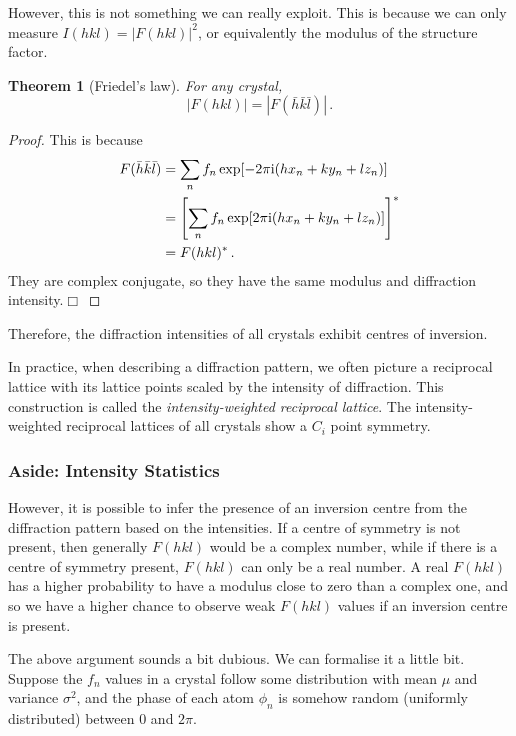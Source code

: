 \documentclass{article}
\theoremstyle{plain}\theoremheaderfont{\normalfont\itshape}\theorembodyfont{\rmfamily}\theoremseparator{.}\newtheorem*{rem}{Remark}\newtheorem*{ex}{Example}\newtheorem*{proof}{Proof}\newtheorem*{altp}{Alternative proof}
\theoremstyle{plain}\theoremheaderfont{\normalfont\bfseries}\theorembodyfont{\rmfamily}\theoremseparator{.}\newtheorem{thm}{Theorem}[section]\newtheorem{lem}[thm]{Lemma}\newtheorem{prop}[thm]{Proposition}\newtheorem*{cor}{Corollary}\newtheorem{defn}[thm]{Definition}\newtheorem{clm}[thm]{Claim}\newtheorem{clminproof}{Claim}\newtheorem*{law}{Law}\newtheorem{pos}[thm]{Postulate}
\theoremstyle{break}\theoremheaderfont{\normalfont\itshape}\theorembodyfont{\rmfamily}\theoremseparator{.\medskip}\newtheorem*{proofskip}{Proof}\newtheorem*{exs}{Examples}\newtheorem*{rems}{Remarks}
\theoremstyle{break}\theoremheaderfont{\normalfont\bfseries}\theorembodyfont{\rmfamily}\theoremseparator{.\medskip}\newtheorem{lemskip}[thm]{Lemma}\newtheorem{defnskip}[thm]{Definition}\newtheorem{propskip}[thm]{Proposition}\newtheorem{thmskip}[thm]{Theorem}
\numberwithin{equation}{section}
\newcommand{\qed}{\hfill\ensuremath{\Box}}
\newcommand{\ii}{\mathrm{i}}
\newcommand{\abs}[1]{\left| #1 \right|}
\begin{document}
    However, this is not something we can really exploit. This is because we can only measure \(I(hkl)=\abs{F(hkl)}^2\), or equivalently the modulus of the structure factor.
    \begin{thm}[Friedel's law]
        For any crystal,
        \begin{equation}
            \abs{F(hkl)}=\abs{F(\bar{h}\bar{k}\bar{l})}\,.
        \end{equation}
    \end{thm}
    \begin{proof}
        This is because
        \begin{align}
            F(\bar{h}\bar{k}\bar{l})&=\sum_n f_n \exp[-2\pi \ii(hx_n+ky_n+lz_n)]\notag\\
            &=\left[\sum_n f_n\exp[2\pi \ii(hx_n+ky_n+lz_n)]\right]^*\notag\\
            &=F(hkl)^*\,.
        \end{align}
        They are complex conjugate, so they have the same modulus and diffraction intensity.\qed
    \end{proof}
    Therefore, the diffraction intensities of all crystals exhibit centres of inversion.

    In practice, when describing a diffraction pattern, we often picture a reciprocal lattice with its lattice points scaled by the intensity of diffraction. This construction is called the \textit{intensity-weighted reciprocal lattice}. The intensity-weighted reciprocal lattices of all crystals show a \(C_i\) point symmetry.

    \subsubsection*{Aside: Intensity Statistics}
    However, it is possible to infer the presence of an inversion centre from the diffraction pattern based on the intensities. If a centre of symmetry is not present, then generally \(F(hkl)\) would be a complex number, while if there is a centre of symmetry present, \(F(hkl)\) can only be a real number. A real \(F(hkl)\) has a higher probability to have a modulus close to zero than a complex one, and so we have a higher chance to observe weak \(F(hkl)\) values if an inversion centre is present.

    The above argument sounds a bit dubious. We can formalise it a little bit. Suppose the \(f_n\) values in a crystal follow some distribution with mean \(\mu\) and variance \(\sigma^2\), and the phase of each atom \(\phi_n\) is somehow random (uniformly distributed) between 0 and \(2\pi\).
    
\end{document}
